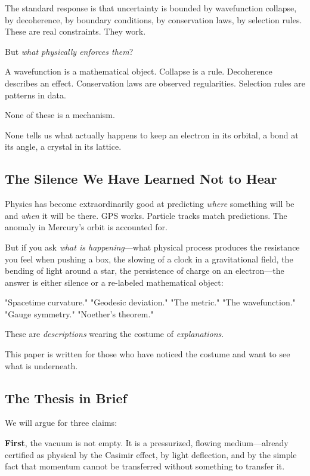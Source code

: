 \documentclass[12pt, a4paper]{article}
\begin{document}
The standard response is that uncertainty is bounded by wavefunction collapse, by decoherence, by boundary conditions, by conservation laws, by selection rules. These are real constraints. They work.

But \textit{what physically enforces them}?

A wavefunction is a mathematical object. Collapse is a rule. Decoherence describes an effect. Conservation laws are observed regularities. Selection rules are patterns in data.

None of these is a mechanism.

None tells us what actually happens to keep an electron in its orbital, a bond at its angle, a crystal in its lattice.

\subsection{The Silence We Have Learned Not to Hear}

Physics has become extraordinarily good at predicting \textit{where} something will be and \textit{when} it will be there. GPS works. Particle tracks match predictions. The anomaly in Mercury's orbit is accounted for.

But if you ask \textit{what is happening}—what physical process produces the resistance you feel when pushing a box, the slowing of a clock in a gravitational field, the bending of light around a star, the persistence of charge on an electron—the answer is either silence or a re-labeled mathematical object:

"Spacetime curvature." "Geodesic deviation." "The metric." "The wavefunction." "Gauge symmetry." "Noether's theorem."

These are \textit{descriptions} wearing the costume of \textit{explanations}.

This paper is written for those who have noticed the costume and want to see what is underneath.

\subsection{The Thesis in Brief}

We will argue for three claims:

\textbf{First}, the vacuum is not empty. It is a pressurized, flowing medium—already certified as physical by the Casimir effect, by light deflection, and by the simple fact that momentum cannot be transferred without something to transfer it.
\end{document}
